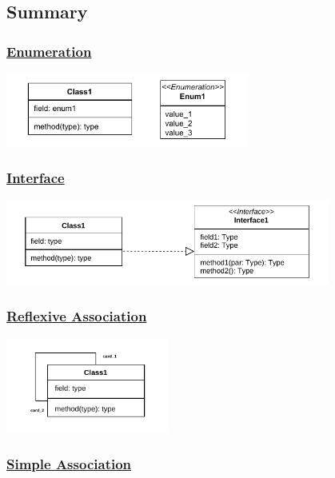 \subsection{Summary}

\subsubsection*{\underline{Enumeration}}
\begin{center}
\includegraphics[width=0.6\textwidth]{Chapters/Diagram/OOP/Sum/Enum/enum.drawio.pdf}
\end{center}

\subsubsection*{\underline{Interface}}
\begin{center}
\includegraphics[width=0.8\textwidth]{Chapters/Diagram/OOP/Sum/Inter/inte.drawio.pdf}
\end{center}

\subsubsection*{\underline{Reflexive Association}}
\begin{center}
    \includegraphics[width=0.4\textwidth]{Chapters/Diagram/OOP/Sum/reflexiveAssoc/selfassoc.drawio.pdf}
\end{center}

\subsubsection*{\underline{Simple Association}}

